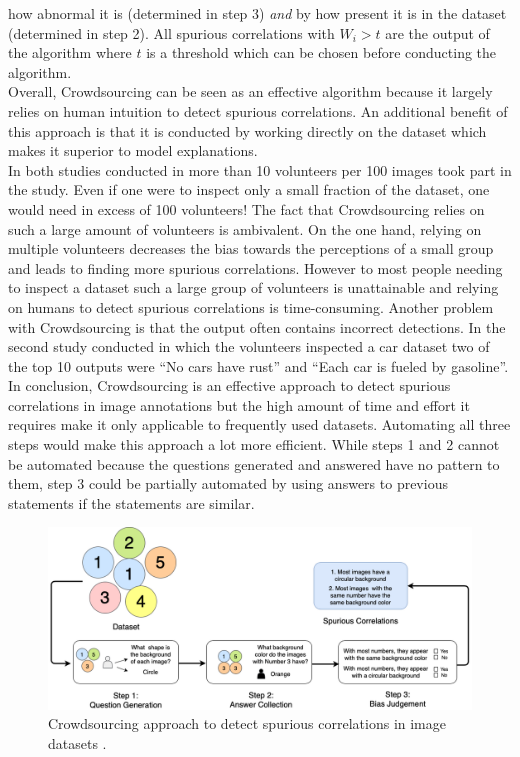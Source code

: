 \documentclass{article}
\begin{document}
how abnormal it is (determined in step 3) \textit{and} by how present it is in the dataset (determined in step 2).
All spurious correlations with $W_i > t$ are the output of the algorithm where $t$ is a threshold which can be chosen
before conducting the algorithm.\\
Overall, Crowdsourcing can be seen as an effective algorithm because it largely relies on human intuition to detect
spurious correlations. An additional benefit of this approach is that it is conducted by working directly
on the dataset which makes it superior to model explanations. \\
In both studies conducted in \cite{10.1145/3366423.3380063} more than 10 volunteers per 100 images took part in the study.
Even if one were to inspect only a small fraction of the dataset, one would need in excess of 100 volunteers!
The fact that Crowdsourcing relies on such a large amount of volunteers is ambivalent. On the one hand, relying on multiple
volunteers decreases the bias towards the perceptions of a small group and leads to finding more spurious correlations.
However to most people needing to inspect a dataset such a large group of volunteers is unattainable and relying on humans
to detect spurious correlations is time-consuming.
Another problem with Crowdsourcing is that the output often contains incorrect detections.
In the second study conducted in which the volunteers inspected a car dataset two of the top 10 outputs
were \enquote{No cars have rust} and \enquote{Each car is fueled by gasoline}. \\
In conclusion, Crowdsourcing is an effective approach to detect spurious correlations in image annotations
but the high amount of time and effort it requires make it only applicable to frequently used datasets. 
Automating all three steps would make this approach a lot more efficient. While steps 1 and 2 cannot be automated because the
questions generated and answered have no pattern to them, step 3 could be partially automated by using answers to previous
statements if the statements are similar.

\begin{figure}[!h]
    \centering
    \includegraphics[scale=0.315]{crowdsourcing.png}
    \caption{Crowdsourcing approach to detect spurious correlations in image datasets \cite{10.1145/3366423.3380063}.}
    \label{fig:crowdsourcing}
\end{figure}
\end{document}
